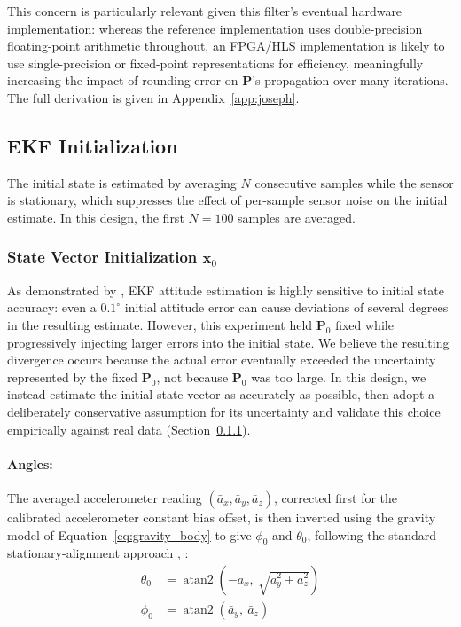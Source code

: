 \documentclass[12pt,a4paper]{article}
\newcommand{\bP}{\bm{P}}
\begin{document}
{This concern is particularly relevant given this filter's eventual
hardware implementation: whereas the reference implementation uses
double-precision floating-point arithmetic throughout, an FPGA/HLS
implementation is likely to use single-precision or fixed-point
representations for efficiency, meaningfully increasing the impact
of rounding error on $\bP$'s propagation over many iterations. The full derivation is given in Appendix~\ref{app:joseph}.

\subsection{EKF Initialization}
\label{sec:init}

The initial state is estimated by averaging $N$ consecutive samples
while the sensor is stationary, which suppresses the effect of
per-sample sensor noise on the initial estimate. In this design, the
first $N = 100$ samples are averaged.

\subsubsection{State Vector Initialization \texorpdfstring{$\bm{x}_0$}{x0}}
\label{sec:x0_init}

As demonstrated by \citep{park2020effects}, EKF attitude estimation is
highly sensitive to initial state accuracy: even a $0.1^{\circ}$
initial attitude error can cause deviations of several degrees in the
resulting estimate. However, this experiment held $\bP_0$ fixed while
progressively injecting larger errors into the initial state. We
believe the resulting divergence occurs because the actual error
eventually exceeded the uncertainty represented by the fixed $\bP_0$,
not because $\bP_0$ was too large. In this design, we instead estimate
the initial state vector as accurately as possible, then adopt a
deliberately conservative assumption for its uncertainty and validate
this choice empirically against real data (Section~\ref{sec:x0_init}).

\paragraph{Angles:} The averaged accelerometer reading
$(\bar{a}_x, \bar{a}_y, \bar{a}_z)$, corrected first for the
calibrated accelerometer constant bias offset, is then inverted using
the gravity model of Equation~\eqref{eq:gravity_body} to give $\phi_0$
and $\theta_0$, following the standard stationary-alignment approach
\citep{silva2021error}, \citep{crassidis2007survey}:
\begin{align}
\label{eq:phi0_tehat0}
  \theta_0 &= \operatorname{atan2}\!\left(-\bar{a}_x,\ \sqrt{\bar{a}_y^2 + \bar{a}_z^2}\right) \\
  \phi_0 &= \operatorname{atan2}\!\left(\bar{a}_y,\ \bar{a}_z\right)
\end{align}

}
\end{document}
